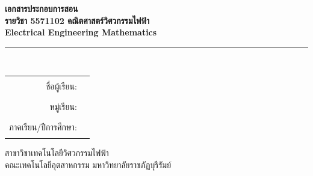 \documentclass[14pt,a4paper]{extarticle}
\begin{document}
\hypersetup{pageanchor=false}

\begin{titlepage}
\begin{center}
    \vspace*{1.2cm}
    {\Huge\bfseries เอกสารประกอบการสอน}\\[1.0em]
    {\LARGE\bfseries รายวิชา 5571102 คณิตศาสตร์วิศวกรรมไฟฟ้า}\\[1.0em]
    {\Large\bfseries Electrical Engineering Mathematics}\\[1.5em]
    \rule{0.82\textwidth}{0.8pt}\\[1.2em]
   
    \vfill

    \begin{tabular}{rl}
        ชื่อผู้เรียน: & \rule{9cm}{0.4pt} \\[1em]
        หมู่เรียน: & \rule{9cm}{0.4pt} \\[1em]
        ภาคเรียน/ปีการศึกษา: & \rule{9cm}{0.4pt}
    \end{tabular}

    \vfill
    {\large สาขาวิชาเทคโนโลยีวิศวกรรมไฟฟ้า}\\[0.25em]
    {\large คณะเทคโนโลยีอุตสาหกรรม มหาวิทยาลัยราชภัฏบุรีรัมย์}
\end{center}
\end{titlepage}
\hypersetup{pageanchor=true}

\tableofcontents
\clearpage
{}



%
%
%
%

%

%
%
%
%
%
%

%
%
%
\end{document}
